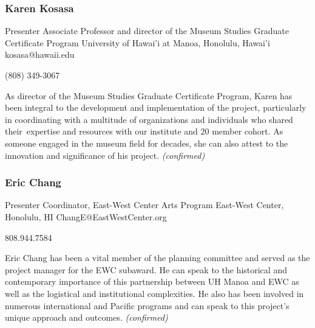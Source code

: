 \documentclass{report}
\begin{document}
              
                \subsubsection*{ Karen Kosasa }
                Presenter\newline
                Associate Professor and director of the Museum Studies Graduate Certificate Program\newline
                University of Hawai’i at Manoa, Honolulu, Hawai'i
                \newline
                kosasa@hawaii.edu\newline
                
                (808) 349-3067\newline

                As director of the Museum Studies Graduate Certificate Program, Karen has been integral to the development and implementation of the project, particularly in coordinating with a multitude of organizations and individuals who shared their expertise and resources with our institute and 20 member cohort. As someone engaged in the museum field for decades, she can also attest to the innovation and significance of his project.
                \emph{ (confirmed) }
              

              
                \subsubsection*{ Eric Chang }
                Presenter\newline
                Coordinator, East-West Center Arts Program \newline
                East-West Center, Honolulu, HI
                \newline
                ChangE@EastWestCenter.org\newline
                
                808.944.7584\newline

                Eric Chang has been a vital member of the planning committee and served as the project manager for the EWC subaward. He can speak to the historical and contemporary importance of this partnership between UH Manoa and EWC as well as the logistical and institutional complexities. He also has been involved in numerous international and Pacific programs and can speak to this project's unique approach and outcomes.
                \emph{ (confirmed) }
              
\end{document}
